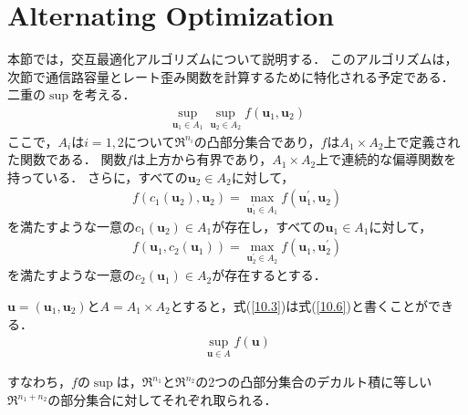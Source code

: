 \documentclass{ltjsarticle}
\theoremstyle{definition}
\begin{document}
\section{Alternating Optimization}
本節では，交互最適化アルゴリズムについて説明する．
このアルゴリズムは，次節で通信路容量とレート歪み関数を計算するために特化される予定である．
二重の$\sup$を考える．
\begin{eqnarray}
  \label{10.3}
  \sup_{\mathbf{u}_1 \in A_1} \sup_{\mathbf{u}_2 \in A_2} f(\mathbf{u}_1, \mathbf{u}_2)
\end{eqnarray}
ここで，$A_i$は$i = 1,2$について$\mathfrak{R}^{n_i}$の凸部分集合であり，$f$は$A_1 \times A_2$上で定義された関数である．
関数$f$は上方から有界であり，$A_1 \times A_2$上で連続的な偏導関数を持っている．
さらに，すべての$\mathbf{u}_2 \in A_2$に対して，
\begin{eqnarray}
  \label{10.4}
  f(c_1(\mathbf{u}_2), \mathbf{u}_2) = \max_{\mathbf{u}_1^{\prime} \in A_1} f(\mathbf{u}_1^{\prime}, \mathbf{u}_2)
\end{eqnarray}
を満たすような一意の$c_1 (\mathbf{u}_2) \in A_1$が存在し，すべての$\mathbf{u}_1 \in A_1$に対して，
\begin{eqnarray}
  \label{10.5}
  f(\mathbf{u}_1, c_2(\mathbf{u}_1)) = \max_{\mathbf{u}_2^{\prime} \in A_2} f(\mathbf{u}_1, \mathbf{u}_2^{\prime})
\end{eqnarray}
を満たすような一意の$c_2(\mathbf{u}_1) \in A_2$が存在するとする．

$\mathbf{u} = (\mathbf{u}_1, \mathbf{u}_2)$と$A = A_1 \times A_2$とすると，式(\ref{10.3})は式(\ref{10.6})と書くことができる．
\begin{eqnarray}
  \label{10.6}
  \sup_{\mathbf{u} \in A} f(\mathbf{u})
\end{eqnarray}

すなわち，$f$の$\sup$は，$\mathfrak{R}^{n_1}$と$\mathfrak{R}^{n_2}$の2つの凸部分集合のデカルト積に等しい$\mathfrak{R}^{n_1 + n_2}$の部分集合に対してそれぞれ取られる．
\end{document}
